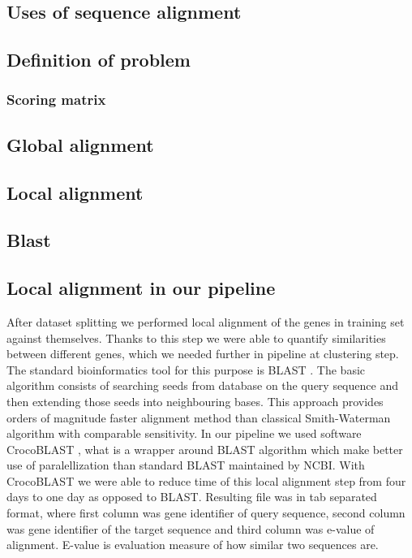 \subsection{Uses of sequence alignment}

\subsection{Definition of problem}
\subsubsection{Scoring matrix}
\subsection{Global alignment}
\subsection{Local alignment}
\subsection{Blast}
\subsection{Local alignment in our pipeline}
After dataset splitting we performed local alignment of the genes in training set against themselves.
Thanks to this step we were able to quantify similarities between different genes, which we needed further in pipeline at clustering step.
The standard bioinformatics tool for this purpose is BLAST \cite{blast}. 
The basic algorithm consists of searching seeds from database on the query sequence and then extending those seeds into neighbouring bases.
This approach provides orders of magnitude faster alignment method than classical Smith-Waterman algorithm \cite{smith_waterman} with comparable sensitivity.
In our pipeline we used software CrocoBLAST \cite{crocoblast}, what is a wrapper around BLAST algorithm which make better use of paralellization than standard BLAST maintained by NCBI.
With CrocoBLAST we were able to reduce time of this local alignment step from four days to one day as opposed to BLAST.
Resulting file was in tab separated format, where first column was gene identifier of query sequence, second column was gene identifier of the target sequence and third column was e-value of alignment. 
E-value is evaluation measure of how similar two sequences are.

